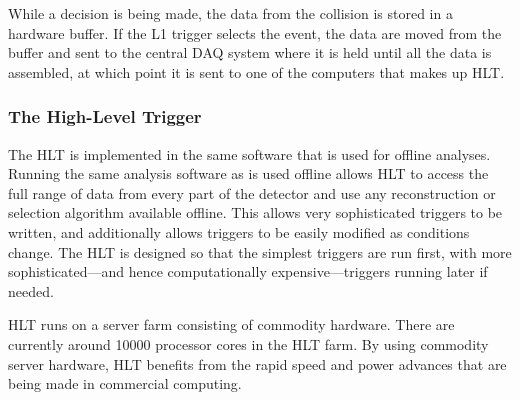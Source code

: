 While a decision is being made, the data from the collision is stored in a
hardware buffer. If the L1 trigger selects the event, the data are moved from
the buffer and sent to the central DAQ system where it is held until all the
data is assembled, at which point it is sent to one of the computers that makes
up HLT.

\subsubsection{The High-Level Trigger}

The HLT is implemented in the same software that is used for offline analyses.
Running the same analysis software as is used offline allows HLT to access the
full range of data from every part of the detector and use any reconstruction
or selection algorithm available offline. This allows very sophisticated
triggers to be written, and additionally allows triggers to be easily modified
as conditions change. The HLT is designed so that the simplest triggers are run
first, with more sophisticated---and hence computationally expensive---triggers
running later if needed.

HLT runs on a server farm consisting of commodity hardware. There are currently
around 10000 processor cores in the HLT farm. By using commodity server
hardware, HLT benefits from the rapid speed and power advances that are being
made in commercial computing.
